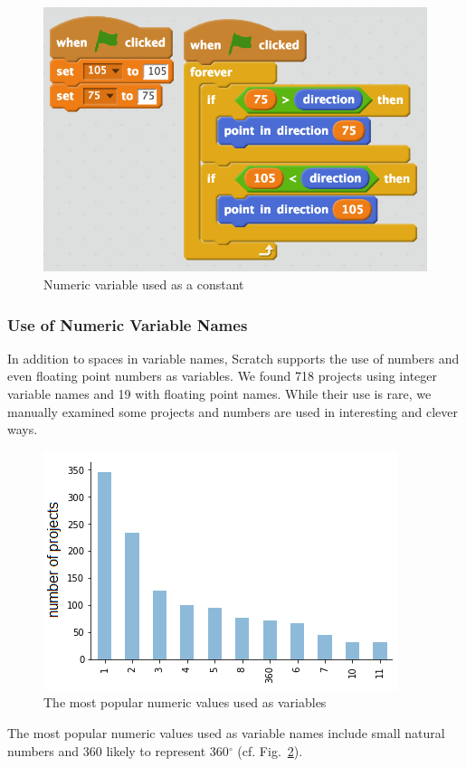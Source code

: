 \documentclass[conference]{IEEEtran}
\begin{document}
\begin{figure}[tb]
	\begin{center}
		\includegraphics[scale=0.46]{fig/constants}
		\caption{Numeric variable used as a constant}
		\label{fig:constants}
	\end{center}
\end{figure} 	

\subsubsection{Use of Numeric Variable Names}
In addition to spaces in variable names, Scratch supports the use of numbers and even floating point numbers as variables. We found 718 projects using integer variable names and 19 with floating point names. While their use is rare, we manually examined some projects and numbers are used in interesting and clever ways. 
\begin{figure}[tb]
	\begin{center}
		\includegraphics[scale=0.6]{fig/project/numeric}
		\caption{The most popular numeric values used as variables}
		\label{fig:numeric}
	\end{center}
\end{figure} 
The most popular numeric values used as variable names include small natural numbers and 360 likely to represent 360$^\circ$ (cf. Fig.~\ref{fig:numeric}).
\end{document}
